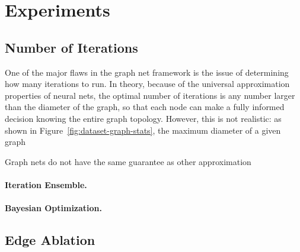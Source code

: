 \section{Experiments}
\label{sec:experiments}

\subsection{Number of Iterations}
One of the major flaws in the graph net framework is the issue of determining how many iterations to run.
In theory, because of the universal approximation properties of neural nets, the optimal number of iterations is any number larger than the diameter of the graph, so that each node can make a fully informed decision knowing the entire graph topology.
However, this is not realistic: as shown in Figure~\ref{fig:dataset-graph-stats}, the maximum diameter of a given graph


Graph nets do not have the same guarantee as other approximation

\paragraph{Iteration Ensemble.}

\paragraph{Bayesian Optimization.}

\subsection{Edge Ablation}


